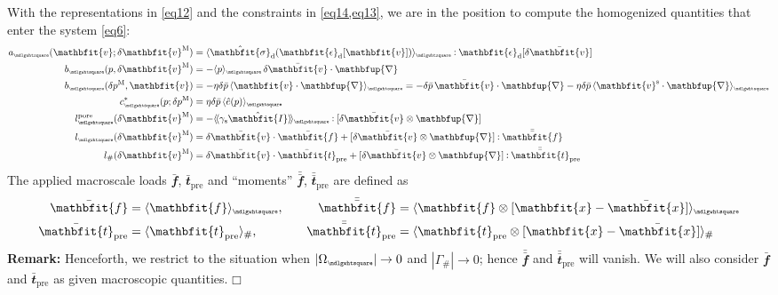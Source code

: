 \documentclass[12pt,a4paper]{article}
\renewcommand{\ta}[1]{\mathbfit{#1}}
\renewcommand{\ts}[1]{\mathbfit{#1}}
\renewcommand{\diff}{\mathbfup{\nabla}}
\renewcommand{\Box}{\mdlgwhtsquare}
\DeclarePairedDelimiter{\homgen}{\langle}{\rangle_\rve}
\DeclarePairedDelimiter{\shomgen}{\langle\!\langle}{\rangle\!\rangle_\rve}
\newcommand{\prescribed}{\mathrm{pre}}
\renewcommand{\dev}{\mathrm{d}}
\newcommand{\volume}{|\Omega_\rve|}
\newcommand{\surf}{\mathrm{s}}
\newcommand{\pore}{\mathrm{pore}}
\newcommand{\devop}{\ts\epsilon_\dev}
\newcommand{\densinv}{\eta}
\newcommand{\rve}{
  {\mathchoice
   {\mbox{\scalebox{0.67}{$\Box$}}}
   {\mbox{\scalebox{0.67}{$\Box$}}}
   {\mbox{\scalebox{0.5}{$\Box$}}}
   {\mbox{\scalebox{0.375}{$\Box$}}}
  }
}
\begin{document}
With the representations in \cref{eq12} and the constraints in \cref{eq14,eq13}, we are in the position to compute the homogenized quantities that enter the system \cref{eq6}:
\begin{align}
    a_\rve(\ta v;\delta\ta v^\macro) &=
    \homgen{ \hat{\ts{\sigma}}_\dev(\devop[\ta v]) } \dprod \devop[\delta\bar{\ta v}] 
\label{eq15a} \\
    b_\rve(p,\delta\ta v^\macro) &=
    -  \homgen{ p }\, \delta\bar{\ta v}\cdot\diff
\label{eq15b} \\
    b_\rve(\delta p^\macro,\ta v) &=
    - \densinv\delta\bar{p}\, \homgen{ \ta v\cdot\diff } = - \delta\bar{p} \, \bar{\ta v}\cdot\diff - \densinv\delta\bar{p}\,\homgen{ \ta v^\fluct\cdot\diff }
\label{eq15c} \\
    c^*_\rve(p;\delta p^\macro) &=
    \densinv\delta\bar{p}\, \homgen{ \hat{e}(p) }
\label{eq15d} \\
    l_\rve^\pore(\delta\ta v^\macro) &=
    -\shomgen{ \gamma_\surf \hat{\ts I} } \dprod [\delta\bar{\ta v}\outerp\diff]
\label{eq15e} \\
    l_\rve(\delta\ta v^\macro) &=
    \delta\bar{\ta v}\cdot \bar{\ta f} + [\delta\bar{\ta v}\outerp\diff]\dprod \bar{\bar{\ta f}}
\label{eq15f} \\
    l_\#(\delta\ta v^\macro) &=
    \delta\bar{\ta v} \cdot \bar{\ta t}_\prescribed + [\delta\bar{\ta v}\outerp\diff]\dprod \bar{\bar{\ta{t}}}_\prescribed
\label{eq15g}
\end{align}
The applied macroscale loads $\bar{\ta f}$, $\bar{\ta t}_\prescribed$ and ``moments'' $\bar{\bar{\ta f}}$, $\bar{\bar{\ta t}}_\prescribed$ are defined as
\begin{alignat}{2}
    \bar{\ta f} &= \homgen{ \ta{f} },\quad
    &\bar{\bar{\ta f}} &= \homgen{ \ta{f}\outerp[\ta{x}-\bar{\ta{x}}] }
\label{eq15fa}
\\
    \bar{\ta t}_\prescribed &= \langle \ta{t}_\prescribed \rangle_\#,\quad
    &\bar{\bar{\ta t}}_\prescribed &= \langle \ta{t}_\prescribed\outerp[\ta{x}-\bar{\ta{x}}]  \rangle_\#
\end{alignat}
\textbf{Remark:} Henceforth, we restrict to the situation when $\volume\to 0$ and $|\Gamma_\#|\to 0$; hence $\bar{\bar{\ta f}}$ and $\bar{\bar{\ta t}}_\prescribed$ will vanish.
We will also consider $\bar{\ta f}$ and $\bar{\ta t}_\prescribed$ as given macroscopic quantities. $\Box$
\end{document}
